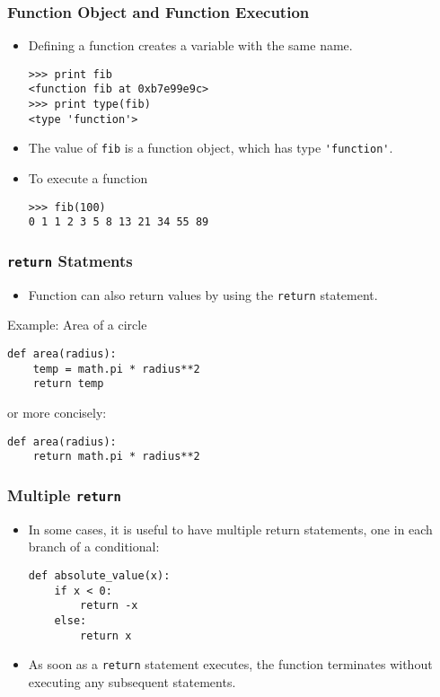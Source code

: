 \documentclass{beamer}
\begin{document}
\begin{frame}[fragile]
\frametitle{Function Object and Function Execution}
\begin{itemize}
\item Defining a function creates a variable with the same name.
\begin{verbatim}
>>> print fib
<function fib at 0xb7e99e9c>
>>> print type(fib)
<type 'function'>
\end{verbatim}
%
\item The value of \verb"fib" is a \alert{ function object}, which
has type \verb"'function'".
\item To execute a function
\begin{verbatim}
>>> fib(100)
0 1 1 2 3 5 8 13 21 34 55 89
\end{verbatim}
\end{itemize}
\end{frame}
\begin{frame}[fragile]
\frametitle{\texttt{return} Statments}
\begin{itemize}
\item Function can also return values by using the \verb"return" statement. 
\end{itemize}
\begin{block}{Example: Area of a circle}
\small
\begin{verbatim}
def area(radius):
    temp = math.pi * radius**2
    return temp
\end{verbatim}
\normalsize
or more concisely:
\small
\begin{verbatim}
def area(radius):
    return math.pi * radius**2
\end{verbatim}
\end{block}
\end{frame}
\begin{frame}[fragile]
\frametitle{Multiple \texttt{return}}
\begin{itemize}
\item  In some cases, it is useful to have multiple return statements, one in each
branch of a conditional:
\begin{block}{}
\small
\begin{verbatim}
def absolute_value(x):
    if x < 0:
        return -x
    else:
        return x
\end{verbatim}
\end{block}
\item As soon as a \verb!return! statement executes, the function
\alert{terminates} without executing any subsequent statements.
\end{itemize}
\end{frame}
\end{document}
